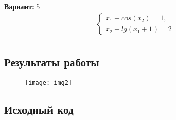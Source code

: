 {\bfseries Вариант:} 5
\begin{align*}
& \begin{cases}
x_1 - cos(x_2) = 1,\\
x_2 - lg(x_1 + 1) = 2
\end{cases}\\
\end{align*}

\subsection{Результаты работы}
\begin{figure}[h!]
\raggedright
\texttt{[image: img2]}
\end{figure}
\pagebreak

\subsection{Исходный код}

\pagebreak
